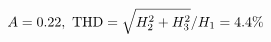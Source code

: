 \documentclass[preview]{standalone}
\begin{document}
\begin{align*}
\special{dvisvgm:raw <g id='unique000'>}A=0.22,\ \text{THD}=\sqrt{H_2^2+H_3^2}/H_1=4.4\%\special{dvisvgm:raw </g>}
\end{align*}
\end{document}
